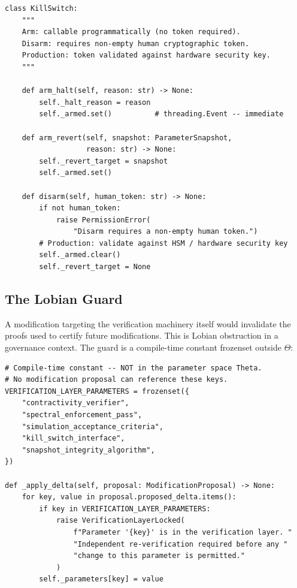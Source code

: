 \documentclass[11pt,letterpaper]{article}
\theoremstyle{remark}
\begin{document}
\begin{lstlisting}[style=python, caption={Kill switch: arm/disarm asymmetry}]
class KillSwitch:
    """
    Arm: callable programmatically (no token required).
    Disarm: requires non-empty human cryptographic token.
    Production: token validated against hardware security key.
    """

    def arm_halt(self, reason: str) -> None:
        self._halt_reason = reason
        self._armed.set()          # threading.Event -- immediate

    def arm_revert(self, snapshot: ParameterSnapshot,
                   reason: str) -> None:
        self._revert_target = snapshot
        self._armed.set()

    def disarm(self, human_token: str) -> None:
        if not human_token:
            raise PermissionError(
                "Disarm requires a non-empty human token.")
        # Production: validate against HSM / hardware security key
        self._armed.clear()
        self._revert_target = None
\end{lstlisting}

\subsection{The Lobian Guard}

A modification targeting the verification machinery itself would
invalidate the proofs used to certify future modifications.
This is Lobian obstruction in a governance context. The guard is a
compile-time constant frozenset outside $\Theta$:

\begin{lstlisting}[style=python, caption={Verification layer protection}]
# Compile-time constant -- NOT in the parameter space Theta.
# No modification proposal can reference these keys.
VERIFICATION_LAYER_PARAMETERS = frozenset({
    "contractivity_verifier",
    "spectral_enforcement_pass",
    "simulation_acceptance_criteria",
    "kill_switch_interface",
    "snapshot_integrity_algorithm",
})

def _apply_delta(self, proposal: ModificationProposal) -> None:
    for key, value in proposal.proposed_delta.items():
        if key in VERIFICATION_LAYER_PARAMETERS:
            raise VerificationLayerLocked(
                f"Parameter '{key}' is in the verification layer. "
                "Independent re-verification required before any "
                "change to this parameter is permitted."
            )
        self._parameters[key] = value
\end{lstlisting}
\end{document}
